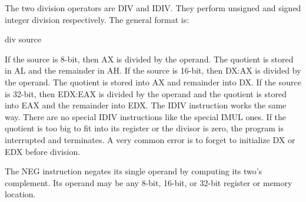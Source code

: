 The two division operators are {\code DIV} and {\code IDIV}. They perform
unsigned and signed integer division respectively. The general format is:
\begin{AsmCodeListing}[numbers=none,frame=none]
      div   source
\end{AsmCodeListing}
If the source is 8-bit, then AX is divided by the operand. The
quotient is stored in AL and the remainder in AH. If the source is
16-bit, then DX:AX is divided by the operand. The quotient is stored
into AX and remainder into DX. If the source is 32-bit, then EDX:EAX
is divided by the operand and the quotient is stored into EAX and the
remainder into EDX. The {\code IDIV}  instruction works the same
way. There are no special {\code IDIV} instructions like the special
{\code IMUL} ones. If the quotient is too big to fit into its register
or the divisor is zero, the program is interrupted and terminates. A
very common error is to forget to initialize DX or EDX before division.

The {\code NEG}  instruction negates its single operand by computing
its two's complement. Its operand may be any 8-bit, 16-bit, or 32-bit
register or memory location.

